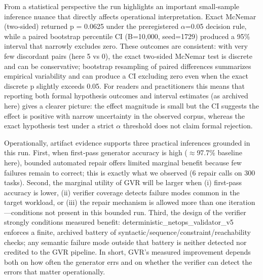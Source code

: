 \documentclass[conference]{IEEEtran}
\begin{document}
From a statistical perspective the run highlights an important small‑sample inference nuance that directly affects operational interpretation. Exact McNemar (two‑sided) returned p = 0.0625 under the preregistered \ensuremath{\alpha}=0.05 decision rule, while a paired bootstrap percentile CI (B=10,000, seed=1729) produced a 95\% interval that narrowly excludes zero. These outcomes are consistent: with very few discordant pairs (here 5 vs 0), the exact two‑sided McNemar test is discrete and can be conservative; bootstrap resampling of paired differences summarizes empirical variability and can produce a CI excluding zero even when the exact discrete p slightly exceeds 0.05. For readers and practitioners this means that reporting both formal hypothesis outcomes and interval estimates (as archived here) gives a clearer picture: the effect magnitude is small but the CI suggests the effect is positive with narrow uncertainty in the observed corpus, whereas the exact hypothesis test under a strict \ensuremath{\alpha} threshold does not claim formal rejection.

Operationally, artifact evidence supports three practical inferences grounded in this run. First, when first‑pass generator accuracy is high (\ensuremath{\approx}97.7\% baseline here), bounded automated repair offers limited marginal benefit because few failures remain to correct; this is exactly what we observed (6 repair calls on 300 tasks). Second, the marginal utility of GVR will be larger when (i) first‑pass accuracy is lower, (ii) verifier coverage detects failure modes common in the target workload, or (iii) the repair mechanism is allowed more than one iteration---conditions not present in this bounded run. Third, the design of the verifier strongly conditions measured benefit: deterministic\_netops\_validator\_v5 enforces a finite, archived battery of syntactic/sequence/constraint/reachability checks; any semantic failure mode outside that battery is neither detected nor credited to the GVR pipeline. In short, GVR's measured improvement depends both on how often the generator errs and on whether the verifier can detect the errors that matter operationally.
\end{document}
